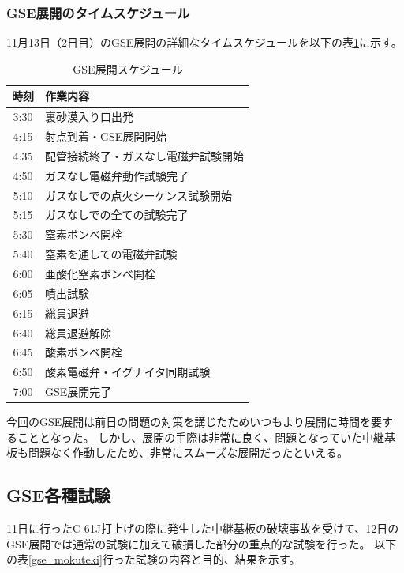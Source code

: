 \documentclass[a4paper,11pt,uplatex]{jsarticle}
\begin{document}
\subsubsection{GSE展開のタイムスケジュール}
11月13日（2日目）のGSE展開の詳細なタイムスケジュールを以下の表\ref{gse_time}に示す。
\begin{table}[H]
	\centering
	\caption{GSE展開スケジュール}
	\begin{tabular}{cl} \toprule
		時刻   & 作業内容               \\ \midrule
		3:30 & 裏砂漠入り口出発           \\
		4:15 & 射点到着・GSE展開開始       \\
		4:35 & 配管接続終了・ガスなし電磁弁試験開始 \\
		4:50 & ガスなし電磁弁動作試験完了      \\
		5:10 & ガスなしでの点火シーケンス試験開始  \\
		5:15 & ガスなしでの全ての試験完了      \\
		5:30 & 窒素ボンベ開栓            \\
		5:40 & 窒素を通しての電磁弁試験       \\
		6:00 & 亜酸化窒素ボンベ開栓         \\
		6:05 & 噴出試験               \\
		6:15 & 総員退避               \\
		6:40 & 総員退避解除             \\
		6:45 & 酸素ボンベ開栓            \\
		6:50 & 酸素電磁弁・イグナイタ同期試験    \\
		7:00 & GSE展開完了            \\
		\bottomrule
	\end{tabular}
	\label{gse_time}
\end{table}

今回のGSE展開は前日の問題の対策を講じたためいつもより展開に時間を要することとなった。
しかし、展開の手際は非常に良く、問題となっていた中継基板も問題なく作動したため、非常にスムーズな展開だったといえる。

\subsection{GSE各種試験}
11日に行ったC-61J打上げの際に発生した中継基板の破壊事故を受けて、12日のGSE展開では通常の試験に加えて破損した部分の重点的な試験を行った。
以下の表\ref{gse_mokuteki}行った試験の内容と目的、結果を示す。
\end{document}
